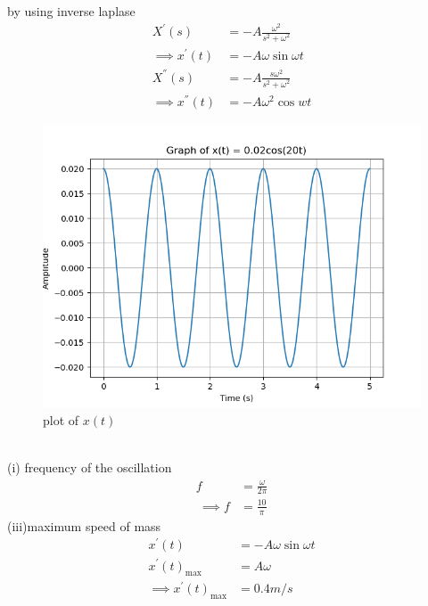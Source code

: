 \documentclass[journal,12pt,twocolumn]{IEEEtran}
\theoremstyle{remark}
\begin{document}
by using inverse laplase
\begin{align}
X^{'}(s)&=-A\frac{\omega^2}{s^2+\omega^2}\\
\implies x^{'}(t)&=-A\omega\sin{\omega t}\\
X^{''}(s)&=-A\frac{s\omega^2}{s^2+\omega^2}\\
\implies x^{''}(t)&=-A\omega^2 \cos{wt}
\end{align}
\begin{figure}[h!]
    \centering
    \includegraphics[width=1.1\linewidth]{figs/analog1.png}
    \caption{plot of $x(t)$}
\end{figure}\\
(i) frequency of the oscillation
\begin{align}
    f&=\frac{\omega}{2\pi}\\\
    \implies f&=\frac{10}{\pi}
\end{align}
(iii)maximum speed of mass\\
\begin{align}
    x^{'}(t)&=-A\omega\sin{\omega t}\\
  x^{'}(t)_{\text{max}}&=A\omega\\
    \implies x^{'}(t)_{\text{max}} &= 0.4 m/s
\end{align}
\end{document}
